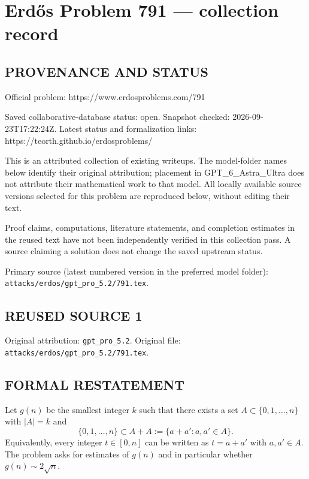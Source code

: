 \section*{Erd\H{o}s Problem 791 --- collection record}

\subsection*{PROVENANCE AND STATUS}
Official problem: https://www.erdosproblems.com/791

Saved collaborative-database status: open.
Snapshot checked: 2026-09-23T17:22:24Z.
Latest status and formalization links: https://teorth.github.io/erdosproblems/

This is an attributed collection of existing writeups. The model-folder names below identify their original attribution; placement in GPT\_6\_Astra\_Ultra does not attribute their mathematical work to that model. All locally available source versions selected for this problem are reproduced below, without editing their text.

Proof claims, computations, literature statements, and completion estimates in the reused text have not been independently verified in this collection pass. A source claiming a solution does not change the saved upstream status.

Primary source (latest numbered version in the preferred model folder): \texttt{attacks/erdos/gpt\_pro\_5.2/791.tex}.

\subsection*{REUSED SOURCE 1}
Original attribution: \texttt{gpt\_pro\_5.2}.
Original file: \texttt{attacks/erdos/gpt\_pro\_5.2/791.tex}.


\subsection*{FORMAL RESTATEMENT}
Let $g(n)$ be the smallest integer $k$ such that there exists a set
$A\subset\{0,1,\dots,n\}$ with $|A|=k$ and
\[
\{0,1,\dots,n\} \subset A+A := \{a+a': a,a'\in A\}.
\]
Equivalently, every integer $t\in[0,n]$ can be written as $t=a+a'$ with $a,a'\in A$.
The problem asks for estimates of $g(n)$ and in particular whether $g(n)\sim 2\sqrt n$.

